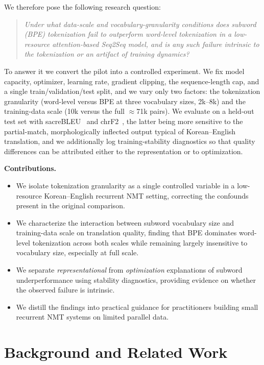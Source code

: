 \documentclass[conference]{IEEEtran}
\begin{document}
We therefore pose the following research question:
\begin{quote}
\emph{Under what data-scale and vocabulary-granularity conditions does subword
(BPE) tokenization fail to outperform word-level tokenization in a low-resource
attention-based Seq2Seq model, and is any such failure intrinsic to the
tokenization or an artifact of training dynamics?}
\end{quote}

To answer it we convert the pilot into a controlled experiment. We fix model
capacity, optimizer, learning rate, gradient clipping, the sequence-length cap,
and a single train/validation/test split, and we vary only two factors: the
tokenization granularity (word-level versus BPE at three vocabulary sizes,
2k--8k) and the training-data scale (10k versus the full $\approx$71k pairs).
We evaluate on a held-out test set with sacreBLEU~\cite{post2018} and
chrF2~\cite{popovic2015}, the latter being more sensitive to the partial-match,
morphologically inflected output typical of Korean--English translation, and we
additionally log training-stability diagnostics so that quality differences can
be attributed either to the representation or to optimization.

\noindent\textbf{Contributions.}
\begin{itemize}
\item We isolate tokenization granularity as a single controlled variable in a
low-resource Korean--English recurrent NMT setting, correcting the confounds
present in the original comparison.
\item We characterize the interaction between subword vocabulary size and
training-data scale on translation quality, finding that BPE dominates
word-level tokenization across both scales while remaining largely insensitive
to vocabulary size, especially at full scale.
\item We separate \emph{representational} from \emph{optimization} explanations
of subword underperformance using stability diagnostics, providing evidence on
whether the observed failure is intrinsic.
\item We distill the findings into practical guidance for practitioners building
small recurrent NMT systems on limited parallel data.
\end{itemize}

\section{Background and Related Work}
\end{document}
